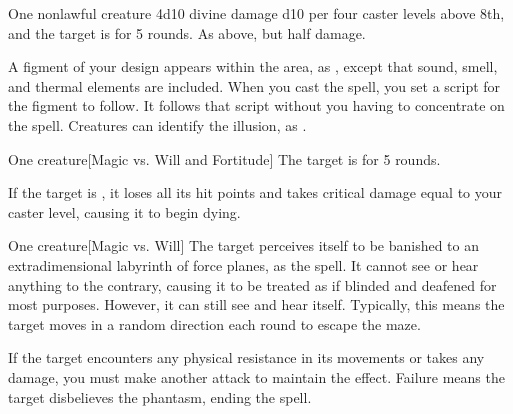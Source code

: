 \spellrng{\rngmed}
\begin{spelltarget}{One nonlawful creature}
    \spellsuccess 4d10 divine damage \add d10 per four caster levels above 8th, and the target is \bewildered for 5 rounds.
    \spellfailure As above, but half damage.
\end{spelltarget}

\spelldur{\durmed \dismissable}
\spellline
\spelleffect A figment of your design appears within the area, as , except that sound, smell, and thermal elements are included. When you cast the spell, you set a script for the figment to follow. It follows that script without you having to concentrate on the spell.
\spellnotes Creatures can identify the illusion, as .

\spellrng{\rngmed}
\begin{spelltarget}{One creature}[Magic vs. Will and Fortitude]
    \spellsuccess[Will] The target is \shaken for 5 rounds.

     If the target is \bloodied, it loses all its hit points and takes critical damage equal to your caster level, causing it to begin dying.
\end{spelltarget}

\spellrng{\rngmed}
\spelldur{\durmed}
\begin{spelltarget}{One creature}[Magic vs. Will]
    \spellsuccess The target perceives itself to be banished to an extradimensional labyrinth of force planes, as the  spell. It cannot see or hear anything to the contrary, causing it to be treated as if blinded and deafened for most purposes. However, it can still see and hear itself. Typically, this means the target moves in a random direction each round to escape the maze.

    If the target encounters any physical resistance in its movements or takes any damage, you must make another attack to maintain the effect. Failure means the target disbelieves the phantasm, ending the spell.
\end{spelltarget}

